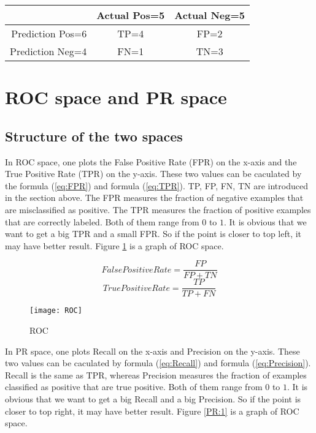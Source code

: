 \documentclass[a4paper,12pt]{article}
\begin{document}
\begin{table}
\centering
\begin{tabular}{|r|c|c|}
\hline
&Actual Pos=5&Actual Neg=5\\
\hline
Prediction Pos=6&TP=4&FP=2\\
\hline
Prediction Neg=4&FN=1&TN=3\\
\hline
\end{tabular}
\caption{}
\end{table}

\section{ROC space and PR space}

\subsection{Structure of the two spaces}
In ROC space, one plots the False Positive Rate (FPR) on the x-axis and the True Positive Rate (TPR) on the y-axis. These two values can be caculated by the formula (\ref{eq:FPR}) and formula (\ref{eq:TPR}). TP, FP, FN, TN are introduced in the section above. The FPR measures the fraction of negative examples that are misclassified as positive. The TPR measures the fraction of positive examples that are correctly labeled. Both of them range from $0$ to $1$. It is obvious that we want to get a big TPR and a small FPR. So if the point is closer to top left, it may have better result. Figure \ref{ROC:1} is a graph of ROC space.

\begin{equation}\label{eq:FPR}
FalsePositiveRate=\frac{FP}{FP+TN}
\end{equation}
\begin{equation}\label{eq:TPR}
TruePositiveRate=\frac{TP}{TP+FN}
\end{equation}

\begin{figure}[!ht]
\centering\texttt{[image: ROC]}
\caption{ROC}\label{ROC:1}
\end{figure} 

In PR space, one plots Recall on the x-axis and Precision on the y-axis. These two values can be caculated by formula (\ref{eq:Recall}) and formula (\ref{eq:Precision}). Recall is the same as TPR, whereas Precision measures the fraction of examples classified as positive that are true positive. Both of them range from $0$ to $1$. It is obvious that we want to get a big Recall and a big Precision. So if the point is closer to top right, it may have better result. Figure \ref{PR:1} is a graph of ROC space.
\end{document}
